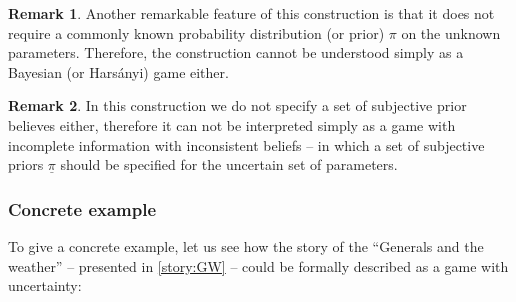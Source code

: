 \documentclass{article}
\theoremstyle{definition}
\newtheorem*{remark}{Remark}
\begin{document}
\begin{remark}
    Another remarkable feature of this construction is that it does not require a commonly known probability distribution (or prior) $\pi$ on the unknown parameters. Therefore, the construction cannot be understood simply as a Bayesian (or Harsányi) game \cite{book:GameTheory} either.
    
\end{remark}

\begin{remark}
    In this construction we do not specify a set of subjective prior believes either, therefore it can not be interpreted simply as a game with incomplete information with inconsistent beliefs \cite{book:GameTheory} -- in which a set of subjective priors $\underline{\pi}$ should be specified for the uncertain set of parameters.
    
\end{remark}

\subsubsection{Concrete example}
\label{sec:ExampleDef}

To give a concrete example, let us see how the story of the ``Generals and the weather'' -- presented in \autoref{story:GW}  -- could be formally described as a game with uncertainty:
\end{document}
